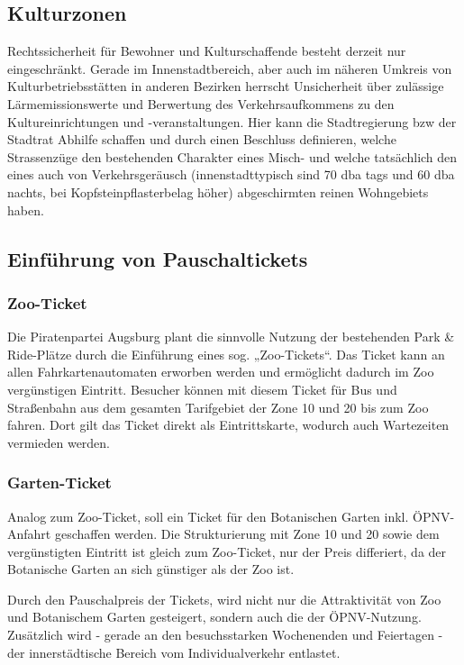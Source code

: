   \subsection{Kulturzonen}
  
  Rechtssicherheit für Bewohner und Kulturschaffende besteht derzeit nur 
  eingeschränkt. Gerade im Innenstadtbereich, aber auch im näheren Umkreis 
  von Kulturbetriebsstätten in anderen Bezirken herrscht Unsicherheit über 
  zulässige Lärmemissionswerte und Berwertung des Verkehrsaufkommens zu den 
  Kultureinrichtungen und -veranstaltungen. Hier kann die Stadtregierung bzw 
  der Stadtrat Abhilfe schaffen und durch einen Beschluss definieren, welche 
  Strassenzüge den bestehenden Charakter eines Misch- und welche tatsächlich 
  den eines auch von Verkehrsgeräusch (innenstadttypisch sind 70 dba tags und 
  60 dba nachts, bei Kopfsteinpflasterbelag höher) abgeschirmten reinen 
  Wohngebiets haben.
  
  \subsection{Einführung von Pauschaltickets}
  
  \subsubsection{Zoo-Ticket}
  
  Die Piratenpartei Augsburg plant die sinnvolle Nutzung der bestehenden 
  Park & Ride-Plätze durch die Einführung eines sog. „Zoo-Tickets“. Das Ticket 
  kann an allen Fahrkartenautomaten erworben werden und ermöglicht dadurch im 
  Zoo vergünstigen Eintritt. Besucher können mit diesem Ticket für Bus und 
  Straßenbahn aus dem gesamten Tarifgebiet der Zone 10 und 20 bis zum Zoo 
  fahren. Dort gilt das Ticket direkt als Eintrittskarte, wodurch auch 
  Wartezeiten vermieden werden.
  
  \subsubsection{Garten-Ticket}
  
  Analog zum Zoo-Ticket, soll ein Ticket für den Botanischen Garten inkl. 
  ÖPNV-Anfahrt geschaffen werden. Die Strukturierung mit Zone 10 und 20 sowie 
  dem vergünstigten Eintritt ist gleich zum Zoo-Ticket, nur der Preis 
  differiert, da der Botanische Garten an sich günstiger als der Zoo ist.
  
  Durch den Pauschalpreis der Tickets, wird nicht nur die Attraktivität von Zoo 
  und Botanischem Garten gesteigert, sondern auch die der ÖPNV-Nutzung. 
  Zusätzlich wird - gerade an den besuchsstarken Wochenenden und Feiertagen - 
  der innerstädtische Bereich vom Individualverkehr entlastet.
  
